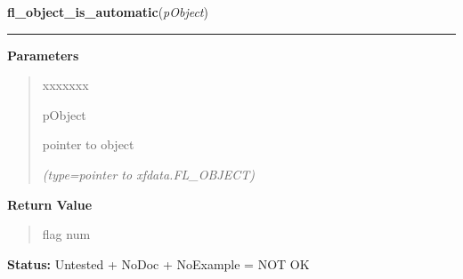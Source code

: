 \hspace{.8\funcindent}\begin{boxedminipage}{\funcwidth}

    \raggedright \textbf{fl\_object\_is\_automatic}(\textit{pObject})

    \vspace{-1.5ex}

    \rule{\textwidth}{0.5\fboxrule}
\setlength{\parskip}{2ex}
\setlength{\parskip}{1ex}
      \textbf{Parameters}
      \vspace{-1ex}

      \begin{quote}
        \begin{Ventry}{xxxxxxx}

          \item[pObject]

          pointer to object

            {\it (type=pointer to xfdata.FL\_OBJECT)}

        \end{Ventry}

      \end{quote}

      \textbf{Return Value}
    \vspace{-1ex}

      \begin{quote}
      flag num

      \end{quote}

\textbf{Status:} Untested + NoDoc + NoExample = NOT OK



    \end{boxedminipage}

    \label{xformslib:library:fl_draw_object_label}

    \vspace{0.5ex}

